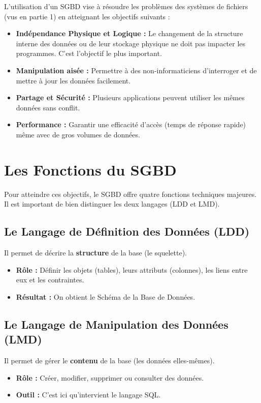L'utilisation d'un SGBD vise à résoudre les problèmes des systèmes de fichiers (vus en partie 1) en atteignant les objectifs suivants :

\begin{itemize}
\item \textbf{Indépendance Physique et Logique :} Le changement de la structure interne des données ou de leur stockage physique ne doit pas impacter les programmes. C'est l'objectif le plus important.
\item \textbf{Manipulation aisée :} Permettre à des non-informaticiens d'interroger et de mettre à jour les données facilement.
\item \textbf{Partage et Sécurité :} Plusieurs applications peuvent utiliser les mêmes données sans conflit.
\item \textbf{Performance :} Garantir une efficacité d'accès (temps de réponse rapide) même avec de gros volumes de données.
\end{itemize}

\section{Les Fonctions du SGBD}
Pour atteindre ces objectifs, le SGBD offre quatre fonctions techniques majeures. Il est important de bien distinguer les deux langages (LDD et LMD).

\subsection{Le Langage de Définition des Données (LDD)}
Il permet de décrire la \textbf{structure} de la base (le squelette).

\begin{itemize}
\item \textbf{Rôle :} Définir les objets (tables), leurs attributs (colonnes), les liens entre eux et les contraintes.
\item \textbf{Résultat :} On obtient le Schéma de la Base de Données.
\end{itemize}

\subsection{Le Langage de Manipulation des Données (LMD)}
Il permet de gérer le \textbf{contenu} de la base (les données elles-mêmes).

\begin{itemize}
\item \textbf{Rôle :} Créer, modifier, supprimer ou consulter des données.
\item \textbf{Outil :} C'est ici qu'intervient le langage SQL.
\end{itemize}

